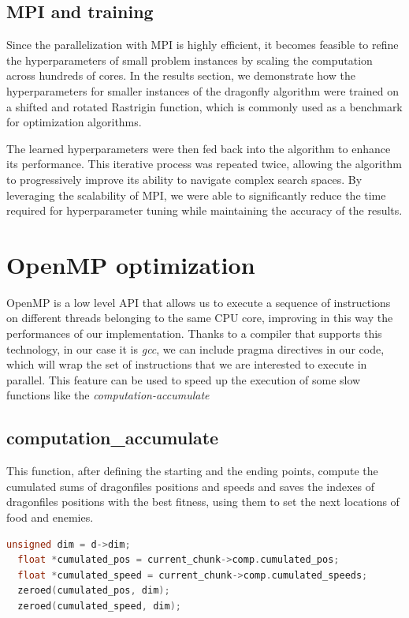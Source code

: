 \documentclass[10pt]{article}
\begin{document}
\begin{multicols}{2}
\subsection*{MPI and training}
Since the parallelization with MPI is highly efficient, it becomes feasible to refine the hyperparameters of small problem instances by scaling the computation across hundreds of cores.
In the results section, we demonstrate how the hyperparameters for smaller instances of the dragonfly algorithm were trained on a shifted and rotated Rastrigin function, which is commonly used as a benchmark for optimization algorithms.

The learned hyperparameters were then fed back into the algorithm to enhance its performance.
This iterative process was repeated twice, allowing the algorithm to progressively improve its ability to navigate complex search spaces.
By leveraging the scalability of MPI, we were able to significantly reduce the time required for hyperparameter tuning while maintaining the accuracy of the results.

\section{OpenMP optimization}

OpenMP is a low level API that allows us to execute a sequence of instructions on different threads belonging
to the same CPU core, improving in this way the performances of our implementation.
Thanks to a compiler that supports this technology, in our case it is \textit{gcc},
we can include  pragma directives in our code,
which will wrap the set of instructions that we are interested to execute
in parallel. This feature can be used to 
speed up the execution of some slow functions like the \textit{computation-accumulate}

\subsection*{computation\_accumulate}

This function, after defining the starting and the ending points, compute
the cumulated sums of dragonfiles positions and speeds 
and saves the indexes of dragonfiles positions with the best fitness, using them
to set the next locations of food and enemies.

\begin{lstlisting}[language=C,caption={the serial version of \textit{computation\_accumulate}}]
  unsigned dim = d->dim;
  float *cumulated_pos = current_chunk->comp.cumulated_pos;
  float *cumulated_speed = current_chunk->comp.cumulated_speeds;
  zeroed(cumulated_pos, dim);
  zeroed(cumulated_speed, dim);


\end{lstlisting}
\end{multicols}
\end{document}
